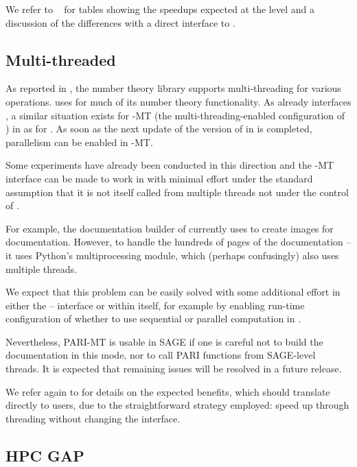 \documentclass{deliverablereport}
\begin{document}
We refer to ~ for tables showing the speedups expected at the
\Singular level and a discussion of the differences with a direct interface to \FLINT.

\subsection{Multi-threaded \Pari}

As reported in , the number theory library \Pari supports
multi-threading for various operations.
\Sage uses \Pari for much of its number theory functionality.
As \Sage already interfaces \Pari, a similar situation exists for \Pari-MT (the multi-threading-enabled
configuration of \Pari) in \SageMath as for \Singular. As soon as the next update of the version of
\Pari in \SageMath is completed, parallelism can be enabled in \Pari-MT.

Some experiments have already been conducted in this direction and the \Pari-MT interface can be
made to work in \SageMath with minimal effort under the standard assumption that it is not itself
called from multiple threads not under the control of \Pari.

For example, the documentation builder of \Sage currently uses \Pari to create images for
documentation. However, to handle the hundreds of pages of the documentation -- it uses Python's
multiprocessing module, which (perhaps confusingly) also uses multiple threads.

We expect that this problem can be easily solved with some additional effort in either the \Sage--\Pari
interface or within \Pari itself, for example by enabling run-time configuration of whether to use
sequential or parallel computation in \Pari.

Nevertheless, PARI-MT is usable in SAGE if one is careful not to build the
documentation in this mode, nor to call PARI functions from SAGE-level
threads. It is expected that remaining issues will be resolved in a future \SageMath
release.

We refer again to  for details on the expected benefits, which should translate
directly to \SageMath users, due to the straightforward strategy employed: speed up \Pari through threading
without changing the interface.

\subsection{HPC GAP}
\end{document}
